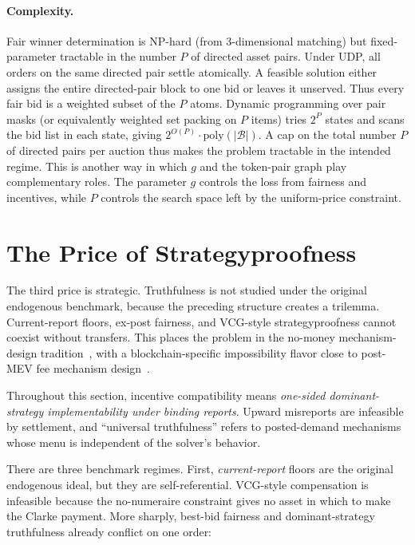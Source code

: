 \documentclass{llncs}
\begin{document}
\paragraph{Complexity.}
Fair winner determination is NP-hard (from 3-dimensional matching) but
fixed-parameter tractable in the number $P$ of directed asset pairs.
Under UDP, all orders on the same directed pair settle atomically. A
feasible solution either assigns the entire directed-pair block to one
bid or leaves it unserved. Thus every fair bid is a weighted subset of
the $P$ atoms. Dynamic programming over pair masks
(or equivalently weighted set packing on $P$ items) tries
$2^P$ states and scans the bid list in each state, giving
$2^{O(P)}\cdot\mathrm{poly}(|\mathcal B|)$.
A cap on the total number $P$ of directed pairs per auction thus makes
the problem tractable in the intended regime. This is another way in which $g$ and the
token-pair graph play complementary roles. The parameter $g$ controls the loss from
fairness and incentives, while $P$ controls the search space left by the
uniform-price constraint.

\section{The Price of Strategyproofness}\label{sec:incentives}

The third price is strategic. Truthfulness is not studied under the
original endogenous benchmark, because the preceding structure creates a
trilemma. Current-report floors, ex-post fairness, and VCG-style
strategyproofness cannot coexist without transfers. This places the
problem in the no-money mechanism-design tradition~\cite{procaccia2013},
with a blockchain-specific impossibility flavor close to post-MEV fee
mechanism design~\cite{bahrani2024}.

Throughout this section, incentive compatibility means \emph{one-sided
dominant-strategy implementability under binding reports}. Upward
misreports are infeasible by settlement, and ``universal truthfulness''
refers to posted-demand mechanisms whose menu is independent of the
solver's behavior.

There are three benchmark regimes. First, \emph{current-report} floors are
the original endogenous ideal, but they are self-referential.
VCG-style compensation is infeasible because the no-numeraire constraint
gives no asset in which to make the Clarke payment. More sharply,
best-bid fairness and dominant-strategy truthfulness already conflict on
one order:
\end{document}
